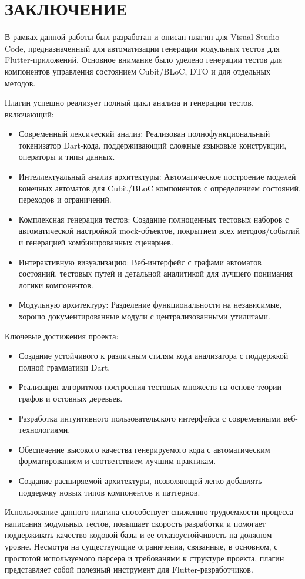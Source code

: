\documentclass[14pt, russian]{scrartcl}
\newcommand{\anonsection}[1]{\cleardoublepage
\phantomsection
\addcontentsline{toc}{section}{\protect\numberline{}#1}
\section*{#1}\vspace*{2.5ex} %
}
\begin{document}
\anonsection{ЗАКЛЮЧЕНИЕ}

В рамках данной работы был разработан и описан плагин для Visual Studio Code, предназначенный для автоматизации генерации модульных тестов для Flutter-приложений. Основное внимание было уделено генерации тестов для компонентов управления состоянием Cubit/BLoC, DTO и для отдельных методов.

Плагин успешно реализует полный цикл анализа и генерации тестов, включающий:
\begin{itemize}
    \item Современный лексический анализ: Реализован полнофункциональный токенизатор Dart-кода, поддерживающий сложные языковые конструкции, операторы и типы данных.
    \item Интеллектуальный анализ архитектуры: Автоматическое построение моделей конечных автоматов для Cubit/BLoC компонентов с определением состояний, переходов и ограничений.
    \item Комплексная генерация тестов: Создание полноценных тестовых наборов с автоматической настройкой mock-объектов, покрытием всех методов/событий и генерацией комбинированных сценариев.
    \item Интерактивную визуализацию: Веб-интерфейс с графами автоматов состояний, тестовых путей и детальной аналитикой для лучшего понимания логики компонентов.
    \item Модульную архитектуру: Разделение функциональности на независимые, хорошо документированные модули с централизованными утилитами.
\end{itemize}

Ключевые достижения проекта:
\begin{itemize}
    \item Создание устойчивого к различным стилям кода анализатора с поддержкой полной грамматики Dart.
    \item Реализация алгоритмов построения тестовых множеств на основе теории графов и остовных деревьев.
    \item Разработка интуитивного пользовательского интерфейса с современными веб-технологиями.
    \item Обеспечение высокого качества генерируемого кода с автоматическим форматированием и соответствием лучшим практикам.
    \item Создание расширяемой архитектуры, позволяющей легко добавлять поддержку новых типов компонентов и паттернов.
\end{itemize}

Использование данного плагина способствует снижению трудоемкости процесса написания модульных тестов, повышает скорость разработки и помогает поддерживать качество кодовой базы и ее отказоустойчивость на должном уровне. Несмотря на существующие ограничения, связанные, в основном, с простотой используемого парсера и требованями к структуре проекта, плагин представляет собой полезный инструмент для Flutter-разработчиков.
\end{document}
